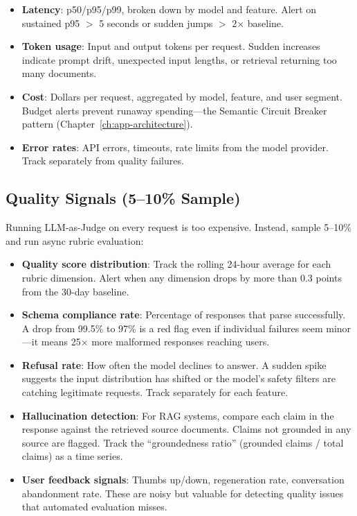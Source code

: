 \begin{itemize}[leftmargin=*]
    \item \textbf{Latency}: p50/p95/p99, broken down by model and feature. Alert on sustained p95 $>$ 5 seconds or sudden jumps $>$ 2$\times$ baseline.
    \item \textbf{Token usage}: Input and output tokens per request. Sudden increases indicate prompt drift, unexpected input lengths, or retrieval returning too many documents.
    \item \textbf{Cost}: Dollars per request, aggregated by model, feature, and user segment. Budget alerts prevent runaway spending---the Semantic Circuit Breaker pattern (Chapter~\ref{ch:app-architecture}).
    \item \textbf{Error rates}: API errors, timeouts, rate limits from the model provider. Track separately from quality failures.
\end{itemize}

\subsection{Quality Signals (5--10\% Sample)}

Running LLM-as-Judge on every request is too expensive. Instead, sample 5--10\% and run async rubric evaluation:

\begin{itemize}[leftmargin=*]
    \item \textbf{Quality score distribution}: Track the rolling 24-hour average for each rubric dimension. Alert when any dimension drops by more than 0.3 points from the 30-day baseline.
    \item \textbf{Schema compliance rate}: Percentage of responses that parse successfully. A drop from 99.5\% to 97\% is a red flag even if individual failures seem minor---it means 25$\times$ more malformed responses reaching users.
    \item \textbf{Refusal rate}: How often the model declines to answer. A sudden spike suggests the input distribution has shifted or the model's safety filters are catching legitimate requests. Track separately for each feature.
    \item \textbf{Hallucination detection}: For RAG systems, compare each claim in the response against the retrieved source documents. Claims not grounded in any source are flagged. Track the ``groundedness ratio'' (grounded claims / total claims) as a time series.
    \item \textbf{User feedback signals}: Thumbs up/down, regeneration rate, conversation abandonment rate. These are noisy but valuable for detecting quality issues that automated evaluation misses.
\end{itemize}


